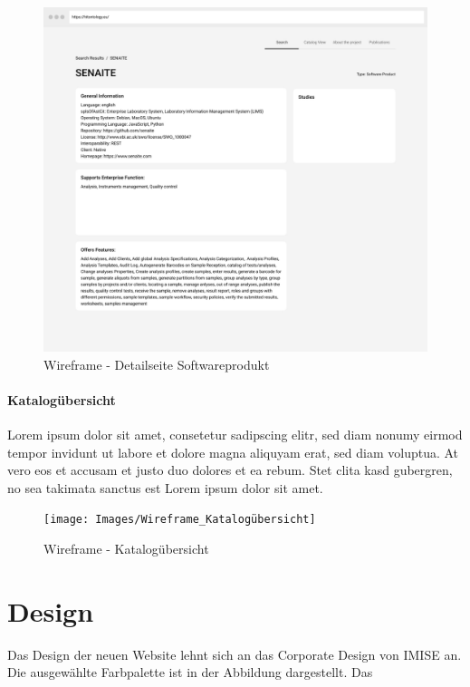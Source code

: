 \begin{figure}[H]
	\centering
    	\includegraphics[width=\textwidth]{Images/Detail_SP}
   	\caption{Wireframe - Detailseite Softwareprodukt}
   	\label{fig:wireframe_detail_sp}
\end{figure}

\paragraph{Katalogübersicht}

Lorem ipsum dolor sit amet, consetetur sadipscing elitr, sed diam nonumy eirmod tempor invidunt ut labore et dolore magna aliquyam erat, sed diam voluptua. 
At vero eos et accusam et justo duo dolores et ea rebum. 
Stet clita kasd gubergren, no sea takimata sanctus est Lorem ipsum dolor sit amet.

\begin{figure}[H]
	\centering
    	\texttt{[image: Images/Wireframe\_Katalogübersicht]}
   	\caption{Wireframe - Katalogübersicht}
   	\label{fig:wireframe_catalogue}
\end{figure}

\section{Design}

Das Design der neuen Website lehnt sich an das Corporate Design von IMISE an.
Die ausgewählte Farbpalette ist in der Abbildung dargestellt.
Das 

